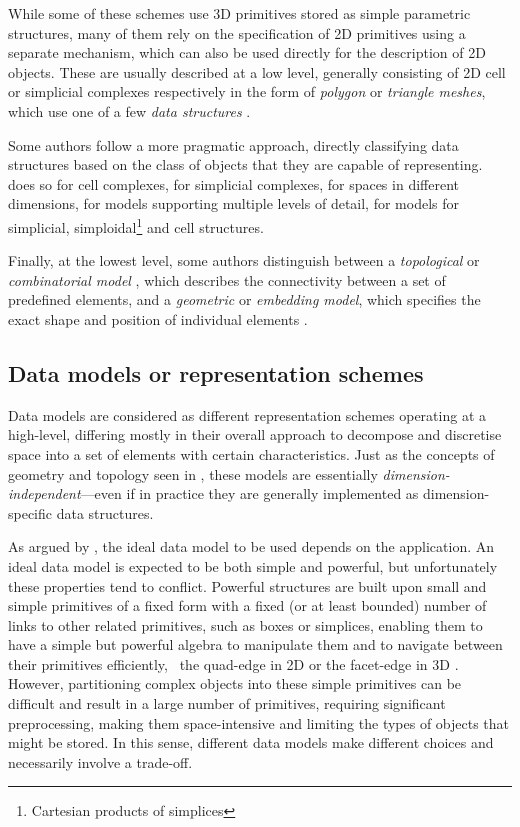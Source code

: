 While some of these schemes use 3D primitives stored as simple parametric structures, many of them rely on the specification of 2D primitives using a separate mechanism, which can also be used directly for the description of 2D objects.
These are usually described at a low level, generally consisting of 2D cell or simplicial complexes respectively in the form of \emph{polygon} or \emph{triangle meshes}, which use one of a few \emph{data structures} \citep{Joy03,Alumbaugh05,Blandford05,deFloriani05}.

Some authors follow a more pragmatic approach, directly classifying data structures based on the class of objects that they are capable of representing.
\citet{Comic12} does so for cell complexes, \citet{deFloriani05} for simplicial complexes, \citet{Lienhardt91} for spaces in different dimensions, \citet{deFloriani05a} for models supporting multiple levels of detail, \citet{Lienhardt09} for models for simplicial, simploidal\footnote{Cartesian products of simplices} and cell structures.

Finally, at the lowest level, some authors distinguish between a \emph{topological} or \emph{combinatorial model} \citep{Lienhardt91}, which describes the connectivity between a set of predefined elements, and a \emph{geometric} or \emph{embedding model}, which specifies the exact shape and position of individual elements \citep{Mantyla88}.

\subsection{Data models or representation schemes}
\label{ss:data-models}

Data models are considered as different representation schemes operating at a high-level, differing mostly in their overall approach to decompose and discretise space into a set of elements with certain characteristics.
Just as the concepts of geometry and topology seen in , these models are essentially \emph{dimension-independent}---even if in practice they are generally implemented as dimension-specific data structures.

As argued by \citet{McKenzie01}, the ideal data model to be used depends on the application.
An ideal data model is expected to be both simple and powerful, but unfortunately these properties tend to conflict.
Powerful structures are built upon small and simple primitives of a fixed form with a fixed (or at least bounded) number of links to other related primitives, such as boxes or simplices, enabling them to have a simple but powerful algebra to manipulate them and to navigate between their primitives efficiently, \eg\ the quad-edge in 2D \citep{Guibas85} or the facet-edge in 3D \citep{Dobkin87}.
However, partitioning complex objects into these simple primitives can be difficult and result in a large number of primitives, requiring significant preprocessing, making them space-intensive and limiting the types of objects that might be stored.
In this sense, different data models make different choices and necessarily involve a trade-off.

